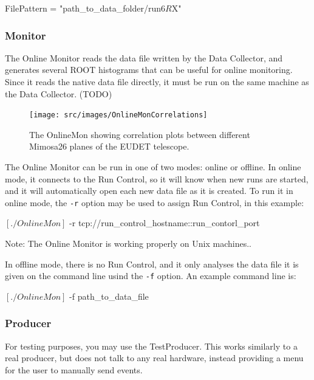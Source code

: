\begin{listing}
FilePattern = "{path_to_data_folder}/run$6R$X"
\end{listing}

\subsubsection{Monitor}
\label{sec:onlinemonitor}
The Online Monitor reads the data file written by the Data Collector,
and generates several ROOT histograms that can be useful for online monitoring.
Since it reads the native data file directly, it must be run on the same machine as the Data Collector. (TODO)

\begin{figure}[htb]
  \begin{center}
    \texttt{[image: src/images/OnlineMonCorrelations]}
    \caption{The OnlineMon showing correlation plots between different
      Mimosa26 planes of the EUDET telescope.}
    \label{fig:OnlineMonPlots}
  \end{center}
\end{figure}

The Online Monitor can be run in one of two modes: online or offline.
In online mode, it connects to the Run Control, so it will know when new runs are started,
and it will automatically open each new data file as it is created.
To run it in online mode, the \texttt{-r} option may be used to assign Run Control, in this example:
\begin{listing}[mybash]
$[./OnlineMon]$ -r tcp://{run_control_hostname}::{run_contorl_port}
\end{listing}
Note: The Online Monitor is working properly on Unix machines..

In offline mode, there is no Run Control,
and it only analyses the data file it is given on the command line usind the \texttt{-f} option. 
An example command line is:
\begin{listing}[mybash]
$[./OnlineMon]$ -f {path_to_data_file}
\end{listing}

\subsubsection{Producer}
\label{sec:testproducer}
For testing purposes, you may use the TestProducer.
This works similarly to a real producer, but does not talk to any real hardware,
instead providing a menu for the user to manually send events.

